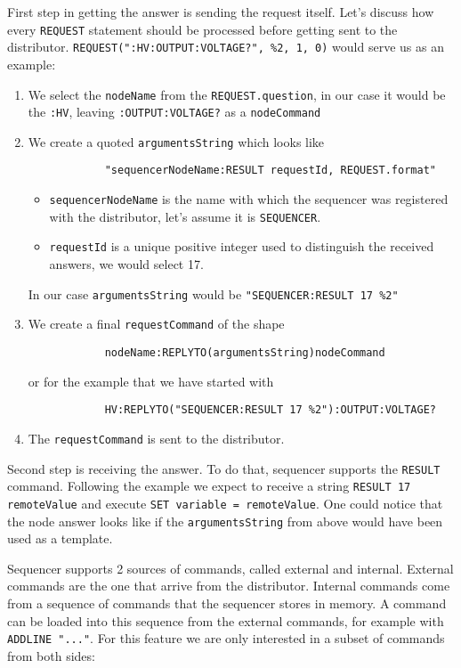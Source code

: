 First step in getting the answer is sending the request itself. Let's discuss how every \texttt{REQUEST} statement should be processed before getting sent to the distributor. \texttt{REQUEST(":HV:OUTPUT:VOLTAGE?", \%2, 1, 0)} would serve us as an example:

\begin{enumerate}
	\item We select the \texttt{nodeName} from the \texttt{REQUEST.question}, in our case it would be the \texttt{:HV}, leaving \texttt{:OUTPUT:VOLTAGE?} as a \texttt{nodeCommand}
	\item{
		We create a quoted \texttt{argumentsString} which looks like 
		\begin{verbatim}
			"sequencerNodeName:RESULT requestId, REQUEST.format"
		\end{verbatim}
		\begin{itemize}
			\item \texttt{sequencerNodeName} is the name with which the sequencer was registered with the distributor, let's assume it is \texttt{SEQUENCER}.
			\item \texttt{requestId} is a unique positive integer used to distinguish the received answers, we would select 17.
		\end{itemize}
		In our case \texttt{argumentsString} would be \texttt{"SEQUENCER:RESULT 17 \%2"}
	}
	\item{
		We create a final \texttt{requestCommand} of the shape
		\begin{verbatim}
			nodeName:REPLYTO(argumentsString)nodeCommand
		\end{verbatim}
		or for the example that we have started with
		\begin{verbatim}
			HV:REPLYTO("SEQUENCER:RESULT 17 %2"):OUTPUT:VOLTAGE?
		\end{verbatim}
	}
	\item The \texttt{requestCommand} is sent to the distributor.
\end{enumerate}

Second step is receiving the answer. To do that, sequencer supports the \texttt{RESULT} command. Following the example we expect to receive a string \texttt{RESULT 17 remoteValue} and execute \texttt{SET variable = remoteValue}. One could notice that the node answer looks like if the \texttt{argumentsString} from above would have been used as a template.

Sequencer supports 2 sources of commands, called external and internal. External commands are the one that arrive from the distributor. Internal commands come from a sequence of commands that the sequencer stores in memory. A command can be loaded into this sequence from the external commands, for example with \texttt{ADDLINE "..."}. For this feature we are only interested in a subset of commands from both sides:

